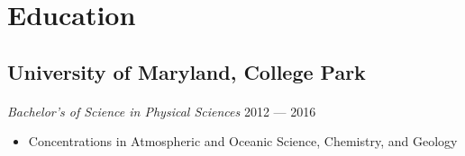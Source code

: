 \documentclass[10pt]{article}
\begin{document}
\dotfill

\section*{Education}
\subsection*{University of Maryland, College Park}
\paragraph{}
\textit{Bachelor's of Science in Physical Sciences} \hfill 2012 --- 2016

\begin{itemize}
  \item Concentrations in Atmospheric and Oceanic Science, Chemistry, and Geology
\end{itemize}
\end{document}
